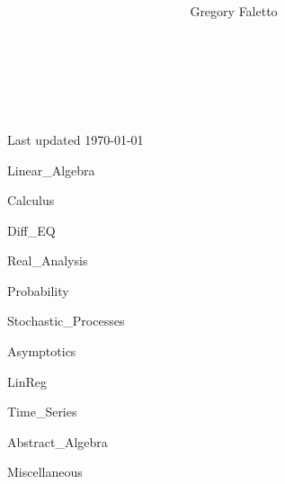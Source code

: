 \documentclass{article}
\title{
    \vspace{2in}
    \textmd{\textbf{ \hmwkTitle}}\\
}
\author{Gregory Faletto}
\date{}
\theoremstyle{definition}
\theoremstyle{definition}
\theoremstyle{definition}
\theoremstyle{definition}
\theoremstyle{definition}
\begin{document}
\maketitle

\pagebreak

\tableofcontents

\

\

\begin{center}
Last updated \today
\end{center}



\newpage

{Linear_Algebra}

\pagebreak

{Calculus}

\pagebreak

{Diff_EQ}

\pagebreak

{Real_Analysis}

\pagebreak

{Probability}

\pagebreak

{Stochastic_Processes}

\pagebreak

{Asymptotics}

\pagebreak

{LinReg}

\pagebreak

{Time_Series}

\pagebreak

{Abstract_Algebra}

\pagebreak

{Miscellaneous}
\end{document}
